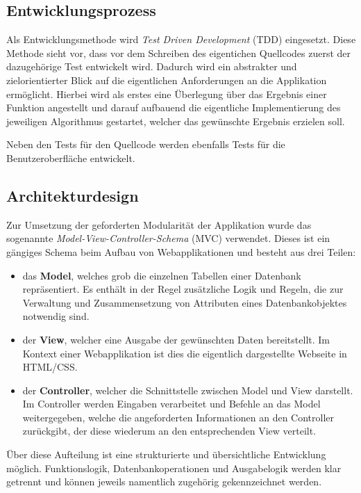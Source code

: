 \subsection{Entwicklungsprozess}
\label{sec:Entwicklungsprozess}
Als Entwicklungsmethode wird \textit{Test Driven Development} (\acs{TDD}) eingesetzt. Diese Methode
sieht vor, dass vor dem Schreiben des eigentichen Quellcodes zuerst der
dazugehörige Test entwickelt wird. Dadurch wird ein abstrakter und
zielorientierter Blick auf die eigentlichen Anforderungen an die Applikation ermöglicht.
Hierbei wird als erstes eine Überlegung über das Ergebnis einer Funktion angestellt und darauf
aufbauend die eigentliche Implementierung des jeweiligen Algorithmus gestartet, welcher das gewünschte
Ergebnis erzielen soll.

Neben den Tests für den Quellcode werden ebenfalls Tests für die Benutzeroberfläche entwickelt.

\subsection{Architekturdesign}
\label{sec:Architekturdesign}
Zur Umsetzung der geforderten Modularität der Applikation wurde das sogenannte
\textit{Model-View-Controller-Schema} (\acs{MVC}) verwendet. Dieses ist ein gängiges Schema beim Aufbau von
Webapplikationen und besteht aus drei Teilen:
\begin{itemize}
	\item das \textbf{Model}, welches grob die einzelnen Tabellen einer Datenbank repräsentiert. Es enthält in
	der Regel zusätzliche Logik und Regeln, die zur Verwaltung und Zusammensetzung von Attributen
	eines Datenbankobjektes notwendig sind.
	\item der \textbf{View}, welcher eine Ausgabe der gewünschten Daten bereitstellt. Im Kontext einer
	Webapplikation ist dies die eigentlich dargestellte Webseite in \acs{HTML}/\acs{CSS}.
	\item der \textbf{Controller}, welcher die Schnittstelle zwischen Model und View darstellt.
	Im Controller werden Eingaben verarbeitet und Befehle an das Model weitergegeben, welche
	die angeforderten Informationen an den Controller zurückgibt, der diese wiederum an den
	entsprechenden View verteilt.
\end{itemize}
Über diese Aufteilung ist eine strukturierte und übersichtliche Entwicklung möglich. Funktionslogik,
Datenbankoperationen und Ausgabelogik werden klar getrennt und können jeweils namentlich zugehörig
gekennzeichnet werden.

